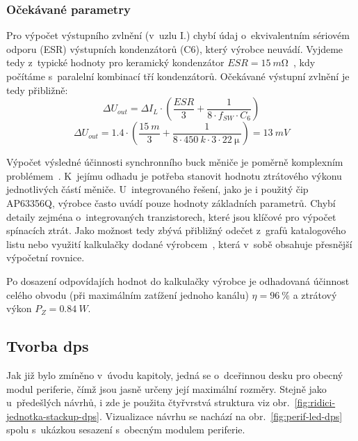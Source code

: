\subsubsection{Očekávané parametry}
    Pro výpočet výstupního zvlnění (v~uzlu I.) chybí údaj o~ekvivalentním sériovém odporu (ESR) výstupních kondenzátorů (C6), který výrobce neuvádí. Vyjdeme tedy z~typické hodnoty pro keramický kondenzátor \(ESR=\qty{15}{m\ohm}\)~\cite{wikipedia2024esr}, kdy počítáme s~paralelní kombinací tří kondenzátorů.
    Očekávané výstupní zvlnění je tedy přibližně:
    \begin{equation}
        \label{rovnice:led_modul}
        \Delta U_{out} = \Delta I_{L} \cdot  \left(\frac{ESR}{3}+\frac{1}{8\cdot f_{SW} \cdot C_{6} }\right) 
    \end{equation} 
    \begin{equation}
        \Delta U_{out} = \num{1.4} \cdot  \left(\frac{\qty{15}{m}}{3}+\frac{1}{8\cdot \qty{450}{k} \cdot 3\cdot \qty{22}{\micro\,} }\right)  = \qty{13}{mV}
    \end{equation} 

    Výpočet výsledné účinnosti synchronního buck měniče je poměrně komplexním problémem~\cite{texasBuckEfficiency}. K~jejímu odhadu je potřeba stanovit hodnotu ztrátového výkonu jednotlivých částí měniče. U~integrovaného řešení, jako je i použitý čip AP63356Q, výrobce často uvádí pouze hodnoty základních parametrů. Chybí detaily zejména o~integrovaných tranzistorech, které jsou klíčové pro výpočet spínacích ztrát. Jako možnost tedy zbývá přibližný odečet z~grafů katalogového listu nebo využití kalkulačky dodané výrobcem~\cite{diodesAP6335xQ}, která v~sobě obsahuje přesnější výpočetní rovnice. 

    Po dosazení odpovídajích hodnot do kalkulačky výrobce je odhadovaná účinnost celého obvodu (při maximálním zatížení jednoho kanálu) \(\eta=\qty{96}{\percent}\) a ztrátový výkon \(P_{Z} = \qty{0.84}{W}\). 

\subsection{Tvorba \acs{dps}}
    Jak již bylo zmíněno v~úvodu kapitoly, jedná se o~dceřinnou desku pro obecný modul periferie, čímž jsou jasně určeny její maximální rozměry. Stejně jako u~předešlých návrhů, i zde je použita čtyřvrstvá struktura viz obr.~\ref{fig:ridici-jednotka-stackup-dps}. Vizualizace návrhu se nachází na obr.~\ref{fig:perif-led-dps} spolu s~ukázkou sesazení s~obecným modulem periferie. 


